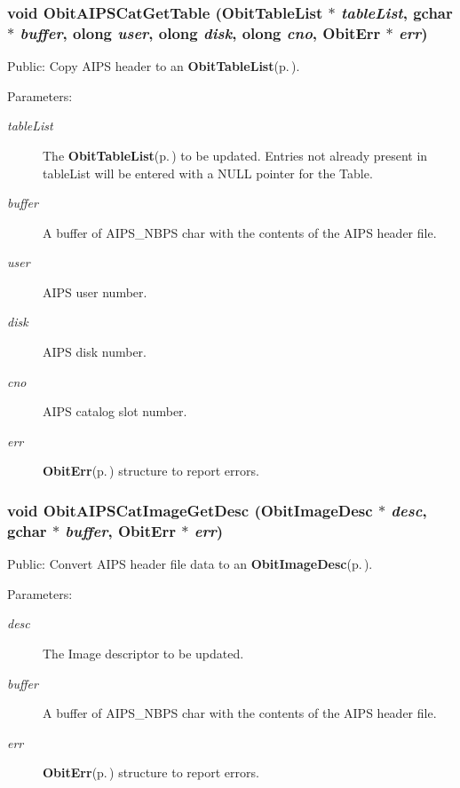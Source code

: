 \subsubsection{\setlength{\rightskip}{0pt plus 5cm}void Obit\-AIPSCat\-Get\-Table ({\bf Obit\-Table\-List} $\ast$ {\em table\-List}, gchar $\ast$ {\em buffer}, {\bf olong} {\em user}, {\bf olong} {\em disk}, {\bf olong} {\em cno}, {\bf Obit\-Err} $\ast$ {\em err})}\label{ObitAIPSCat_8c_a9}


Public: Copy AIPS header to an {\bf Obit\-Table\-List}{\rm (p.\,\pageref{structObitTableList})}. 

\begin{Desc}
\item[Parameters:]
\begin{description}
\item[{\em table\-List}]The {\bf Obit\-Table\-List}{\rm (p.\,\pageref{structObitTableList})} to be updated. Entries not already present in table\-List will be entered with a NULL pointer for the Table. \item[{\em buffer}]A buffer of AIPS\_\-NBPS char with the contents of the AIPS header file. \item[{\em user}]AIPS user number. \item[{\em disk}]AIPS disk number. \item[{\em cno}]AIPS catalog slot number. \item[{\em err}]{\bf Obit\-Err}{\rm (p.\,\pageref{structObitErr})} structure to report errors. \end{description}
\end{Desc}
\subsubsection{\setlength{\rightskip}{0pt plus 5cm}void Obit\-AIPSCat\-Image\-Get\-Desc ({\bf Obit\-Image\-Desc} $\ast$ {\em desc}, gchar $\ast$ {\em buffer}, {\bf Obit\-Err} $\ast$ {\em err})}\label{ObitAIPSCat_8c_a5}


Public: Convert AIPS header file data to an {\bf Obit\-Image\-Desc}{\rm (p.\,\pageref{structObitImageDesc})}. 

\begin{Desc}
\item[Parameters:]
\begin{description}
\item[{\em desc}]The Image descriptor to be updated. \item[{\em buffer}]A buffer of AIPS\_\-NBPS char with the contents of the AIPS header file. \item[{\em err}]{\bf Obit\-Err}{\rm (p.\,\pageref{structObitErr})} structure to report errors. \end{description}
\end{Desc}
